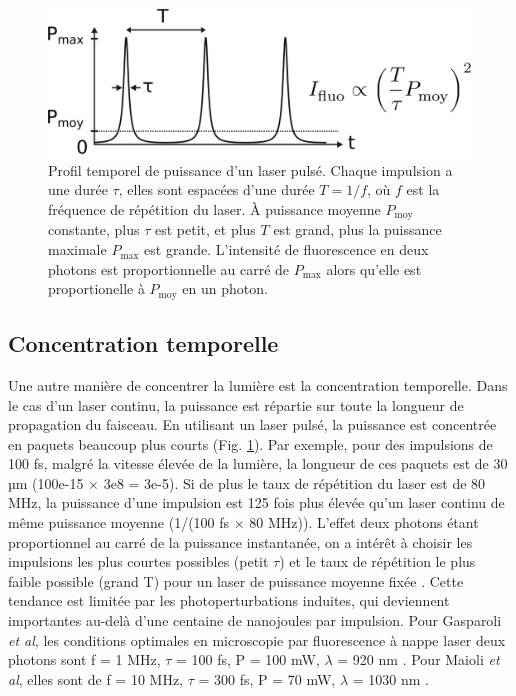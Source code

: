 \begin{figure}[p]
    \centering
    \includegraphics[width=\textwidth]{./files/pulsed_laser.svg.png}
    \caption{Profil temporel de puissance d'un laser pulsé. Chaque impulsion a une durée $\tau$, elles sont espacées d'une durée $T=1/f$, où $f$ est la fréquence de répétition du laser. À puissance moyenne $P_\text{moy}$ constante, plus $\tau$ est petit, et plus $T$ est grand, plus la puissance maximale $P_\text{max}$ est grande. L'intensité de fluorescence en deux photons est proportionnelle au carré de $P_\text{max}$ alors qu'elle est proportionelle à $P_\text{moy}$ en un photon.
    }
    \label{FIGpulsed-laser}
    \end{figure}

\subsection{Concentration temporelle}\label{SECTIONconcentrationtemporelle}
    
Une autre manière de concentrer la lumière est la concentration temporelle. Dans le cas d'un laser continu, la puissance est répartie sur toute la longueur de propagation du faisceau. En utilisant un laser pulsé, la puissance est concentrée en paquets beaucoup plus courts (Fig. \ref{FIGpulsed-laser}). Par exemple, pour des impulsions de 100 fs, malgré la vitesse élevée de la lumière, la longueur de ces paquets est de 30 µm (100e-15 $\times$ 3e8 = 3e-5). Si de plus le taux de répétition du laser est de 80 MHz, la puissance d'une impulsion est 125 fois plus élevée qu'un laser continu de même puissance moyenne (1/(100 fs $\times$ 80 MHz)). L'effet deux photons étant proportionnel au carré de la puissance instantanée, on a intérêt à choisir les impulsions les plus courtes possibles (petit $\tau$) et le taux de répétition le plus faible possible (grand T) pour un laser de puissance moyenne fixée \cite{maioli_fast_2020}. Cette tendance est limitée par les photoperturbations induites, qui deviennent importantes au-delà d'une centaine de nanojoules par impulsion. Pour Gasparoli \emph{et al}, les conditions optimales en microscopie par fluorescence à nappe laser deux photons sont f = 1 MHz, $\tau$ = 100 fs, P = 100 mW, $\lambda$ = 920 nm \cite{gasparoli_is_2020}. Pour Maioli \emph{et al}, elles sont de f = 10 MHz, $\tau$ = 300 fs, P = 70 mW, $\lambda$ = 1030 nm \cite{maioli_fast_2020}.

